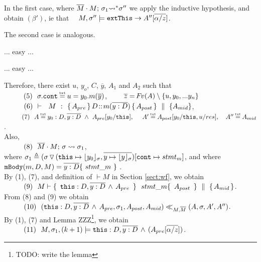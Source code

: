 \begin{description}
In the first case, where $\overline{M}\cdot M;\, {\sigma_1} {\rightsquigarrow^*} \sigma''$ we apply the inductive hypothesis, and obtain $(\beta')$, ie that \ \ $ M, \sigma'' \models \mbox{\normalfont{\texttt{extThis}}} \rightarrow A''[\overline{\alpha/z}]$.

 The second case is analogous.
 
  \item[{\sc{combine}}] ... easy ...
  
 \item[{\sc{consequ}}] ... easy ...
%
%
\item[{\sc{Call\_Int}}]
 
 Therefore, there exist $u$, $y_o$, $C$, $\overline y$,  $A_1$ and $A_2$ such that \\
 $\SPS (5) \ \ \sigma.\prg{cont}\txteq u=y_0.m(\overline y)$,  \ \ \ \ $\overline z = {\hspace{-1pt}F\hspace{-1pt}}v(A)\setminus \{ u, y_0, ... y_n \}$
\\ 
$\strut \ \ \hspace{0.5cm} \ \  (6) \  \ {\vdash \ \ M\ \ \mathbf{:}\ \  \{\, A_{pre}\, \}\, D\!::\!m(\overline{y:D})\, \{\, A_{post}\, \} \, \,\parallel\,\, \{ A_{mid} \}}$, \\
$\SPS (7) \  \ A \txteq y_0:D ,\overline {y:D}\ \wedge \  A_{pre}[y_0/\prg{this}],\ \  \ \ 
A'  \txteq A_{post}[y_0/\prg{this},u/res],\ \  \  A'' \txteq  A_{mid}$. 
\\
Also, \\
$\strut \ \ \hspace{0.5cm} \ \  (8) \ \ \overline{M}\cdot M;\, {\sigma} \rightsquigarrow \sigma_1$, \\
 where $\sigma_1\triangleq ( \sigma \, {\triangledown}\,  (\mbox{\normalfont{\texttt{this}}}\mapsto {\lfloor y_0 \rfloor_{\sigma}},{\overline{y \mapsto {\lfloor y \rfloor_{\sigma}}}}) [\mbox{\normalfont{\texttt{cont}}}\mapsto stmt_m]$, and where 
  $\prg{mBody}(m,D,M)=\overline{y:D}\{\    stmt\_m\ \}$ .\\
By (1), (7), and definition of $\vdash M$ in Section \ref{sect:wf}, we obtain\\
$\SPS (9) \ \ M \vdash  \quadruple { \ \prg{this}:D,\overline{y:D}\, \wedge\, A_{pre}\  } {\ stmt\_m } {\ A_{post}\ } {A_{mid}}$.\\
From (8) and (9) we obtain  \\
$\strut \ \ \hspace{0.5cm} \ \  (10) \ \ (\mbox{\normalfont{\texttt{this}}}:D,\overline{y:D}\, \wedge\, A_{pre},\sigma_1,A_{post}, A_{mid}) \ll_{M,\overline{M}} (A,\sigma,A', A'')$. 
\\
By (1), (7) and Lemma ZZZ\footnote{TODO: write the lemma}, we obtain\\
$\strut \ \ \hspace{0.5cm} \ \  (11) \ \  M,\sigma_1 ,{(k+1)} \models {\mbox{\normalfont{\texttt{this}}}:D,\overline{y:D}\, \wedge\, (A_{pre}[\overline{\alpha/z}])} $.


\end{description}
